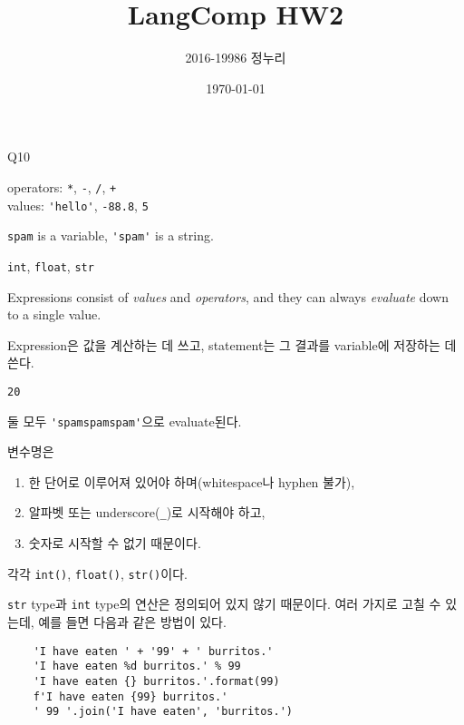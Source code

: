 \documentclass[a4paper,11pt]{scrartcl}
\title{\vspace{-0.5in}LangComp HW2}
\author{\vspace{-15pt}2016-19986 정누리}
\date{\vspace{-10pt}\today}
\begin{document}
\maketitle

\begin{labeling}{Q10}
  \item[Q1]
  operators: \lstinline{*}, \lstinline{-}, \lstinline{/}, \lstinline{+} \\
  values: \lstinline{'hello'}, \lstinline{-88.8}, \lstinline{5}

  \item[Q2]
  \lstinline{spam} is a variable, \lstinline{'spam'} is a string.

  \item[Q3]
  \lstinline{int}, \lstinline{float}, \lstinline{str}

  \item[Q4]
  Expressions consist of \textit{values} and \textit{operators}, and they can always \textit{evaluate} down to a single value.

  \item[Q5]
  Expression은 값을 계산하는 데 쓰고, statement는 그 결과를 variable에 저장하는 데 쓴다.

  \item[Q6]
  \lstinline{20}

  \item[Q7]
  둘 모두 \lstinline{'spamspamspam'}으로 evaluate된다.

  \item[Q8]
  변수명은
  \begin{enumerate}
    \item 한 단어로 이루어져 있어야 하며(whitespace나 hyphen 불가),
    \item 알파벳 또는 underscore(\lstinline{_})로 시작해야 하고,
    \item 숫자로 시작할 수 없기 때문이다.
  \end{enumerate}

  \item[Q9]
  각각 \lstinline{int()}, \lstinline{float()}, \lstinline{str()}이다.

  \item[Q10]
  \lstinline{str} type과 \lstinline{int} type의 연산은 정의되어 있지 않기 때문이다. 여러 가지로 고칠 수 있는데, 예를 들면 다음과 같은 방법이 있다.

  \begin{lstlisting}
    'I have eaten ' + '99' + ' burritos.'
    'I have eaten %d burritos.' % 99
    'I have eaten {} burritos.'.format(99)
    f'I have eaten {99} burritos.'
    ' 99 '.join('I have eaten', 'burritos.')
    \end{lstlisting}

\end{labeling}
\end{document}
